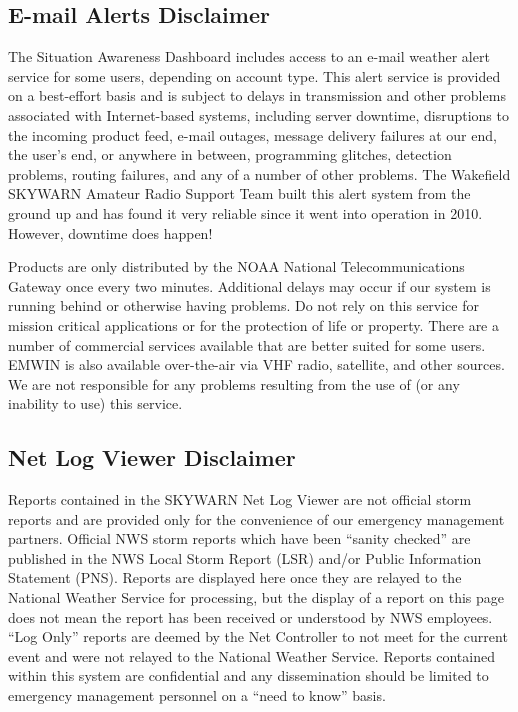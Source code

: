\documentclass[pdflatex,letterpaper,twoside,12pt]{book}
\begin{document}
\subsection{E-mail Alerts Disclaimer}
The Situation Awareness Dashboard includes access to an e-mail weather alert service for some users, depending on account type.  This alert service is provided on a best-effort basis and is subject to delays in transmission and other problems associated with Internet-based systems, including server downtime, disruptions to the incoming product feed, e-mail outages, message delivery failures at our end, the user's end, or anywhere in between, programming glitches, detection problems, routing failures, and any of a number of other problems.  The Wakefield SKYWARN Amateur Radio Support Team built this alert system from the ground up and has found it very reliable since it went into operation in 2010.  However, downtime does happen!

Products are only distributed by the NOAA National Telecommunications Gateway once every two minutes. Additional delays may occur if our system is running behind or otherwise having problems.  Do not rely on this service for mission critical applications or for the protection of life or property.  There are a number of commercial services available that are better suited for some users. EMWIN is also available over-the-air via VHF radio, satellite, and other sources.  We are not responsible for any problems resulting from the use of (or any inability to use) this service.

\subsection{Net Log Viewer Disclaimer}

Reports contained in the SKYWARN Net Log Viewer are not official storm reports and are provided only for the convenience of our emergency management partners. Official NWS storm reports which have been ``sanity checked'' are published in the NWS Local Storm Report (LSR) and/or Public Information Statement (PNS). Reports are displayed here once they are relayed to the National Weather Service for processing, but the display of a report on this page does not mean the report has been received or understood by NWS employees.  ``Log Only'' reports are deemed by the Net Controller to not meet  for the current event and were not relayed to the National Weather Service.  Reports contained within this system are confidential and any dissemination should be limited to emergency management personnel on a ``need to know'' basis.
\end{document}
